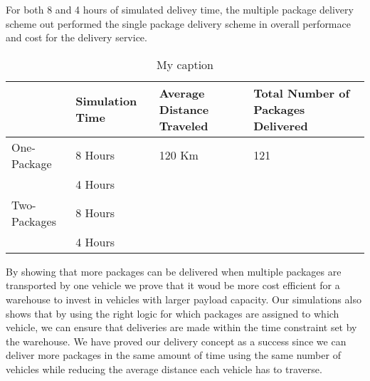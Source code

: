 
For both 8 and 4 hours of simulated delivey time, the multiple package delivery scheme out performed the single package delivery scheme in overall performace and cost for the delivery service. 

\begin{table}[]
\centering
\caption{My caption}
\label{my-label}
\begin{tabular}{l|l|l|l|}
\cline{2-4}
                                                                                                          & Simulation Time & Average Distance Traveled & Total Number of Packages Delivered \\ \hline
\multicolumn{1}{|l|}{One-Package}   & 8 Hours         & 120 Km             & 121                             \\ \cline{2-4} 
\multicolumn{1}{|l|}{}                         & 4 Hours         &                           &                                    \\ \hline
\multicolumn{1}{|l|}{Two-Packages} & 8 Hours         &                           &                                    \\ \cline{2-4} 
\multicolumn{1}{|l|}{}                         & 4 Hours         &                           &                                    \\ \hline
\end{tabular}
\end{table}

By showing that more packages can be delivered when multiple packages are transported by one vehicle we prove that it woud be more cost efficient for a warehouse to invest in vehicles with larger payload capacity. Our simulations also shows that by using the right logic for which packages are assigned to which vehicle, we can ensure that deliveries are made within the time constraint set by the warehouse. We have proved our delivery concept as a success since we can deliver more packages in the same amount of time using the same number of vehicles while reducing the average distance each vehicle has to traverse.